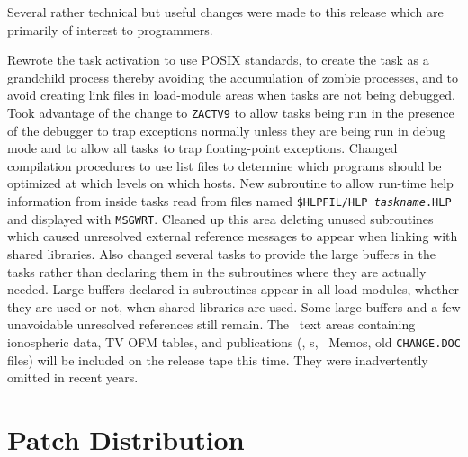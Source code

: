 Several rather technical but useful changes were made to this release
which are primarily of interest to programmers.
\begin{description}
 Rewrote the task activation to use POSIX standards, to
    create the task as a grandchild process thereby avoiding the
    accumulation of zombie processes, and to avoid creating link files
    in load-module areas when tasks are not being debugged.
 Took advantage of the change to {\tt ZACTV9} to allow
    tasks being run in the presence of the debugger to trap exceptions
    normally unless they are being run in debug mode and to allow all
    tasks to trap floating-point exceptions.
 Changed compilation procedures to use list files to
    determine which programs should be optimized at which levels on
    which hosts.
 New subroutine to allow run-time help information from
    inside tasks read from files named {\tt \$HLPFIL/HLP{\it
    taskname}.HLP} and displayed with \hbox{{\tt MSGWRT}}.
 Cleaned up this area deleting unused subroutines which
    caused unresolved external reference messages to appear when
    linking with shared libraries.  Also changed several tasks to
    provide the large buffers in the tasks rather than declaring them
    in the subroutines where they are actually needed.  Large buffers
    declared in subroutines appear in all load modules, whether they
    are used or not, when shared libraries are used.  Some large
    buffers and a few unavoidable unresolved references still remain.
 The \AIPS\ text areas containing ionospheric data, TV
    OFM tables, and publications (\Cookbook, \AIPSLETTER s, \AIPS\
    Memos, old {\tt CHANGE.DOC} files) will be included on the release
    tape this time.  They were inadvertently omitted in recent years.
\end{description}

\section{Patch Distribution}

